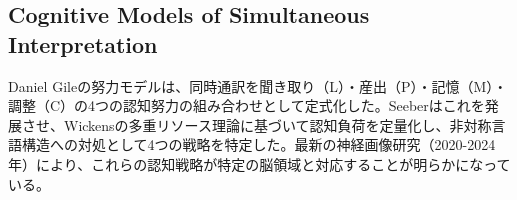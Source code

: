 \subsection{Cognitive Models of Simultaneous Interpretation}


Daniel Gileの努力モデルは、同時通訳を聞き取り（L）・産出（P）・記憶（M）・調整（C）の4つの認知努力の組み合わせとして定式化した。Seeberはこれを発展させ、Wickensの多重リソース理論に基づいて認知負荷を定量化し、非対称言語構造への対処として4つの戦略を特定した。最新の神経画像研究（2020-2024年）により、これらの認知戦略が特定の脳領域と対応することが明らかになっている。
